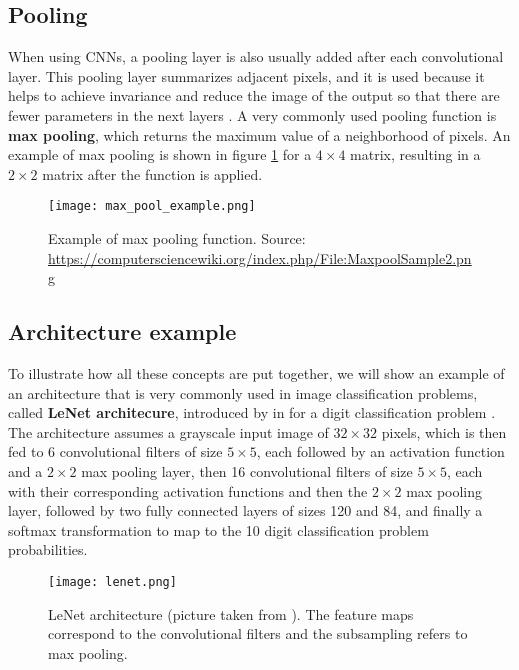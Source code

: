 \subsection{Pooling}

When using CNNs, a pooling layer is also usually added after each convolutional layer. This pooling layer summarizes adjacent pixels, and it is used because it helps to achieve invariance and reduce the image of the output so that there are fewer parameters in the next layers \cite{bengio2015deep}. A very commonly used pooling function is \textbf{max pooling}, which returns the maximum value of a neighborhood of pixels. An example of max pooling is shown in figure \ref{fig:max_pool_example} for a $4 \times 4$ matrix, resulting in a $2 \times 2$ matrix after the function is applied.

\begin{figure}[H]
    \centering
    \texttt{[image: max\_pool\_example.png]}
    \caption{Example of max pooling function. Source: \url{https://computersciencewiki.org/index.php/File:MaxpoolSample2.png}}
    \label{fig:max_pool_example}
\end{figure}


\subsection{Architecture example}

To illustrate how all these concepts are put together, we will show an example of an architecture that is very commonly used in image classification problems, called \textbf{LeNet architecure}, introduced by \citeauthor{lecun1998gradient} in \citeyear{lecun1998gradient} for a digit classification problem \cite{lecun1998gradient}. The architecture assumes a grayscale input image of $32 \times 32$ pixels, which is then fed to 6 convolutional filters of size $5 \times 5$, each followed by an activation function and a $2 \times 2$ max pooling layer, then 16 convolutional filters of size $5 \times 5$, each with their corresponding activation functions and then the $2 \times 2$ max pooling layer, followed by two fully connected layers of sizes 120 and 84, and finally a softmax transformation to map to the 10 digit classification problem probabilities.

\begin{figure}[H]
    \centering
    \texttt{[image: lenet.png]}
    \caption{LeNet architecture (picture taken from \cite{lecun1998gradient}). The feature maps correspond to the convolutional filters and the subsampling refers to max pooling.}
    \label{fig:lenet_architecture}
\end{figure}



